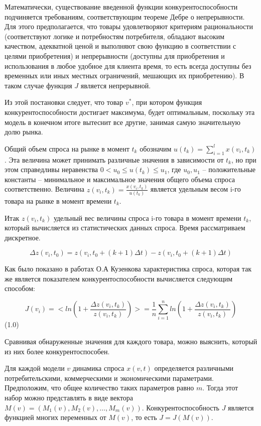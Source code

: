 \documentclass[14pt, a4paper]{extarticle}
\begin{document}
  Математически, существование введенной функции конкурентоспособности подчиняется требованиям, соответствующим теореме Дебре о непрерывности. Для этого предполагается, что товары удовлетворяют критериям рациональности (соответствуют логике и потребностям потребителя, обладают высоким качеством, адекватной ценой и выполняют свою функцию в соответствии с целями приобретения) и непрерывности (доступны для приобретения и использования в любое удобное для клиента время, то есть всегда доступны без временных или иных местных ограничений, мешающих их приобретению). В таком случае функция \( J \) является непрерывной.

  Из этой постановки следует, что товар \( v^* \), при котором функция конкурентоспособности достигает максимума, будет оптимальным, поскольку эта модель в конечном итоге вытеснит все другие, занимая самую значительную долю рынка.
  
  Общий объем спроса на рынке в момент \( t_k \) обозначим \( u(t_k) = \sum_{i=1}^l x(v_i, t_k) \). Эта величина может принимать различные значения в зависимости от \( t_k \), но при этом справедливы неравенства \( 0 < u_0 \leq u(t_k) \leq u_1 \), где \( u_0, u_1 \) – положительные константы – минимальное и максимальное значения общего объема спроса соответственно. Величина \( z(v_i, t_k) = \frac{x(v_i, t_k)}{u(t_k)} \) является удельным весом i-го товара на рынке в момент времени \( t_k \).
  
  Итак \( z(v_i, t_k) \) удельный вес величины спроса i-го товара в момент времени \( t_k \), который вычисляется из статистических данных спроса. Время рассматриваем дискретное.
  
  \[
  \Delta z(v_i, t_0) = z(v_i, t_0 + (k+1)\Delta t) - z(v_i, t_0 + (k+1)\Delta t)
  \]
  
  \noindent Как было показано в работах О.А Кузенкова характеристика спроса, которая так же является показателем конкурентоспособности вычисляется следующим способом:
  
  \[
  J(v_i) =< ln(1+\frac{\Delta z(v_i, t_k)}{z(v_i, t_k)}) >= \frac{1}{n} \sum_{i=1}^n ln(1+\frac{\Delta z(v_i, t_k)}{z(v_i, t_k)})
  \](1.0)
  
  Сравнивая обнаруженные значения для каждого товара, можно выяснить, который из них более конкурентоспособен.
  
  Для каждой модели \( v \) динамика спроса \( x(v, t) \) определяется различными потребительскими, коммерческими и экономическими параметрами. Предположим, что общее количество таких параметров равно \( m \). Тогда этот набор можно представлять в виде вектора \( M(v) = (M_1(v), M_2(v), \ldots, M_m(v)) \). Конкурентоспособность \( J \) является функцией многих переменных от \( M(v) \), то есть \( J = J(M(v)) \).
  
\end{document}
